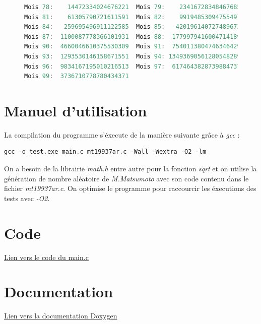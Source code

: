 \documentclass{article}
\newcommand{\changeurlcolor}[1]{\hypersetup{urlcolor=#1}}
\begin{document}
\begin{figure}[!ht]
\begin{lstlisting}[language=c++]
Mois 78:    14472334024676221  Mois 79:    23416728348467685  Mois 80:    37889062373143906  
Mois 81:    61305790721611591  Mois 82:    99194853094755497  Mois 83:   160500643816367088  
Mois 84:   259695496911122585  Mois 85:   420196140727489673  Mois 86:   679891637638612258  
Mois 87:  1100087778366101931  Mois 88:  1779979416004714189  Mois 89:  2880067194370816120  
Mois 90:  4660046610375530309  Mois 91:  7540113804746346429  Mois 92: 12200160415121876738  
Mois 93:  1293530146158671551  Mois 94: 13493690561280548289  Mois 95: 14787220707439219840  
Mois 96:  9834167195010216513  Mois 97:  6174643828739884737  Mois 98: 16008811023750101250  
Mois 99:  3736710778780434371    
\end{lstlisting}
\end{figure}

\newpage
\appendix
\section{Manuel d'utilisation}
La compilation du programme s'éxecute de la manière suivante grâce à \emph{gcc} :

\begin{lstlisting}[language=c++]
  gcc -o test.exe main.c mt19937ar.c -Wall -Wextra -O2 -lm
\end{lstlisting}
On a besoin de la librairie \emph{math.h} entre autre pour la fonction \emph{sqrt} 
et on utilise la génération de nombre aléatoire de \emph{M.Matsumoto} avec son code
contenu dans le fichier \emph{mt19937ar.c}.
On optimise le programme pour raccourcir les éxecutions des tests avec \emph{-O2}.

\section{Code}
\changeurlcolor{blue}\href{run:main.c}{Lien vers le code du main.c}

\section{Documentation}
\changeurlcolor{blue}\href{run:Documentation.pdf}{Lien vers la documentation Doxygen}
\end{document}
